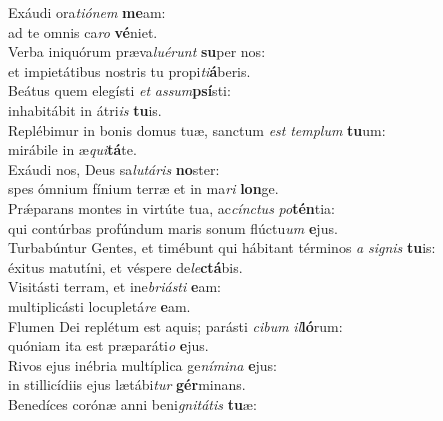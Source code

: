 \evenverse Exáudi ora\textit{ti}\textit{ó}\textit{nem} \textbf{me}am:~\*\\
\evenverse ad te omnis ca\textit{ro} \textbf{vé}niet.\\
\oddverse Verba iniquórum præva\textit{lu}\textit{é}\textit{runt} \textbf{su}per nos:~\*\\
\oddverse et impietátibus nostris tu propi\textit{ti}\textbf{á}beris.\\
\evenverse Beátus quem elegísti \textit{et} \textit{as}\textit{sum}\textbf{psí}sti:~\*\\
\evenverse inhabitábit in átri\textit{is} \textbf{tu}is.\\
\oddverse Replébimur in bonis domus tuæ, sanctum \textit{est} \textit{tem}\textit{plum} \textbf{tu}um:~\*\\
\oddverse mirábile in æ\textit{qui}\textbf{tá}te.\\
\evenverse Exáudi nos, Deus sa\textit{lu}\textit{tá}\textit{ris} \textbf{no}ster:~\*\\
\evenverse spes ómnium fínium terræ et in ma\textit{ri} \textbf{lon}ge.\\
\oddverse Prǽparans montes in virtúte tua, ac\textit{cín}\textit{ctus} \textit{po}\textbf{tén}tia:~\*\\
\oddverse qui contúrbas profúndum maris sonum flúctu\textit{um} \textbf{e}jus.\\
\evenverse Turbabúntur Gentes, et timébunt qui hábitant términos \textit{a} \textit{si}\textit{gnis} \textbf{tu}is:~\*\\
\evenverse éxitus matutíni, et véspere de\textit{le}\textbf{ctá}bis.\\
\oddverse Visitásti terram, et ine\textit{bri}\textit{á}\textit{sti} \textbf{e}am:~\*\\
\oddverse multiplicásti locupletá\textit{re} \textbf{e}am.\\
\evenverse Flumen Dei replétum est aquis; parásti \textit{ci}\textit{bum} \textit{il}\textbf{ló}rum:~\*\\
\evenverse quóniam ita est præparáti\textit{o} \textbf{e}jus.\\
\oddverse Rivos ejus inébria multíplica ge\textit{ní}\textit{mi}\textit{na} \textbf{e}jus:~\*\\
\oddverse in stillicídiis ejus lætábi\textit{tur} \textbf{gér}minans.\\
\evenverse Benedíces corónæ anni beni\textit{gni}\textit{tá}\textit{tis} \textbf{tu}æ:~\*\\
